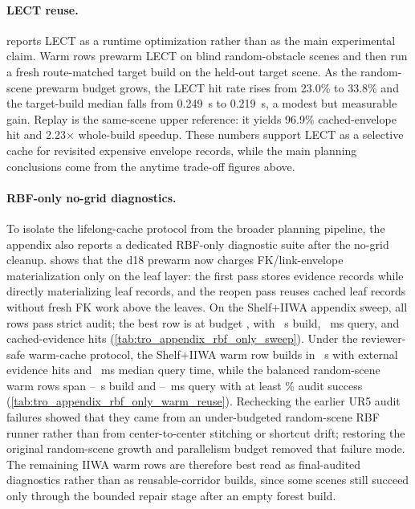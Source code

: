 \documentclass[journal]{IEEEtran}
\begin{document}
\paragraph{LECT reuse.}
 reports LECT as a runtime optimization rather
than as the main experimental claim. Warm rows prewarm LECT on blind
random-obstacle scenes and then run a fresh route-matched target build on the
held-out target scene. As the random-scene prewarm budget grows, the LECT hit
rate rises from 23.0\% to 33.8\% and the target-build median falls from
0.249~s to 0.219~s, a modest but measurable gain. Replay is the same-scene
upper reference: it yields 96.9\% cached-envelope hit and 2.23$\times$
whole-build speedup. These numbers support LECT as a selective cache for
revisited expensive envelope records, while the main planning conclusions come
from the anytime trade-off figures above.

\paragraph{RBF-only no-grid diagnostics.}
To isolate the lifelong-cache protocol from the broader planning pipeline, the
appendix also reports a dedicated RBF-only diagnostic suite after the no-grid
cleanup.  shows that the d18
prewarm now charges FK/link-envelope materialization only on the leaf layer:
the first pass stores \TroRbfOnlyEFiveEvidence{} evidence records while directly
materializing \TroRbfOnlyEFiveLeafFk{} leaf records, and the reopen pass reuses
\TroRbfOnlyEFiveReopenReuse{} cached leaf records without fresh FK work above
the leaves. On the Shelf+IIWA appendix sweep, all
\TroRbfOnlySweepFullPassRows{} rows pass strict audit; the best row is
\TroRbfOnlySweepBestEnvelope{} at budget \TroRbfOnlySweepBestBudget{}, with
\TroRbfOnlySweepBestBuild~s build, \TroRbfOnlySweepBestQueryMs~ms query, and
\TroRbfOnlySweepBestReuse{} cached-evidence hits
(\cref{tab:tro_appendix_rbf_only_sweep}). Under the reviewer-safe warm-cache
protocol, the Shelf+IIWA warm row builds in \TroRbfOnlyShelfWarmBuild~s with
\TroRbfOnlyShelfWarmExternalReuse{} external evidence hits and
\TroRbfOnlyShelfWarmQueryMs~ms median query time, while the balanced
random-scene warm rows span \TroRbfOnlyEFourWarmBuildMin--\TroRbfOnlyEFourWarmBuildMax~s
build and \TroRbfOnlyEFourWarmQueryMinMs--\TroRbfOnlyEFourWarmQueryMaxMs~ms
query with at least \TroRbfOnlyEFourWarmAuditMin\% audit success
(\cref{tab:tro_appendix_rbf_only_warm_reuse}). Rechecking the earlier UR5
audit failures showed that they came from an under-budgeted random-scene RBF
runner rather than from center-to-center stitching or shortcut drift;
restoring the original random-scene growth and parallelism budget removed that
failure mode. The remaining IIWA warm rows are therefore best read as
final-audited diagnostics rather than as reusable-corridor builds, since some
scenes still succeed only through the bounded repair stage after an empty
forest build.
\end{document}
